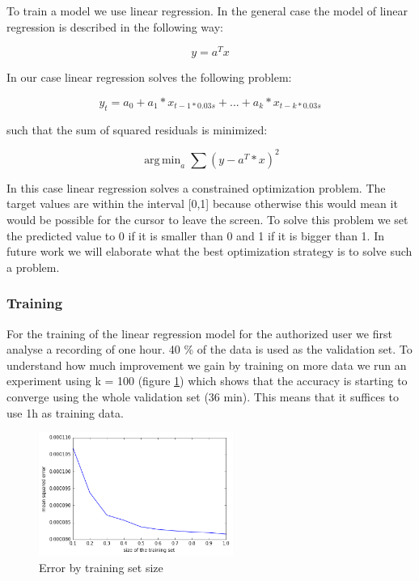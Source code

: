 \documentclass[conference]{IEEEtran}
\DeclareMathOperator*{\argmin}{arg\,min}
\begin{document}
To train a model we use linear regression. In the general case the model of linear regression is described in the following way:

\begin{equation}
y = a^{T} x
\end{equation}

In our case linear regression solves the following problem: 

\begin{equation}
y_{t} = a_{0} + a_{1} * x_{t - 1 * 0.03s} + ... + a_{k} * x_{t - k * 0.03s}
\end{equation}

such that the sum of squared residuals is minimized:

\begin{equation}
\label{eq:problem}
\argmin_{a} \sum (y - a^T*x)^2
\end{equation}

In this case linear regression solves a constrained optimization problem. The target values are within the interval [0,1] because otherwise this would mean it would be possible for the cursor to leave the screen. To solve this problem we set the predicted value to 0 if it is smaller than 0 and 1 if it is bigger than 1. In future work we will elaborate what the best optimization strategy is to solve such a problem.


\subsubsection{Training}

For the training of the linear regression model for the authorized user we first analyse a recording of one hour. 40 \% of the data is used as the validation set. To understand how much improvement we gain by training on more data we run an experiment using k = 100 (figure \ref{fig_trainingsize}) which shows that the accuracy is starting to converge using the whole validation set (36 min). This means that it suffices to use 1h as training data.

\begin{figure}[!t]
\centering
\includegraphics[width=2.5in]{img/error_trainingsize.png}
\caption{Error by training set size}
\label{fig_trainingsize}
\end{figure}
\end{document}
